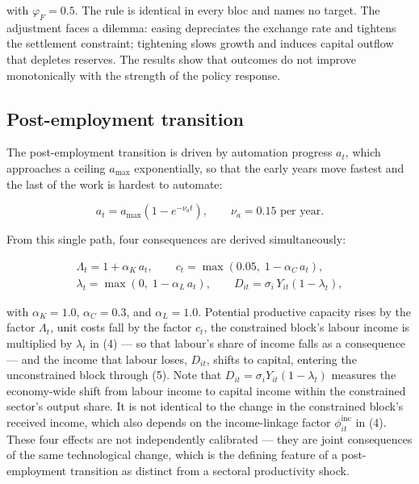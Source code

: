 \documentclass[preprint,review,12pt]{elsarticle}
\begin{document}
with \(\varphi_F = 0.5\). The rule is identical in every bloc and names
no target. The adjustment faces a dilemma: easing depreciates the
exchange rate and tightens the settlement constraint; tightening slows
growth and induces capital outflow that depletes reserves. The results
show that outcomes do not improve monotonically with the strength of the
policy response.

\subsection{Post-employment transition}

The post-employment transition is driven by automation progress \(a_t\),
which approaches a ceiling \(a_{\max}\) exponentially, so that the early
years move fastest and the last of the work is hardest to automate:

\[a_t = a_{\max} \left( 1 - e^{-\nu_a t} \right), \qquad \nu_a = 0.15 \text{ per year}. \tag{37}\]

From this single path, four consequences are derived simultaneously:

\[\begin{gathered} \Lambda_t = 1 + \alpha_K \, a_t, \qquad c_t = \max\left( 0.05,\; 1 - \alpha_C \, a_t \right), \\ \lambda_t = \max\left( 0,\; 1 - \alpha_L \, a_t \right), \qquad D_{it} = \sigma_i \, Y_{it} \left( 1 - \lambda_t \right), \end{gathered} \tag{38}\]

with \(\alpha_K = 1.0\), \(\alpha_C = 0.3\), and \(\alpha_L = 1.0\).
Potential productive capacity rises by the factor \(\Lambda_t\), unit
costs fall by the factor \(c_t\), the constrained block's labour income
is multiplied by \(\lambda_t\) in (4) --- so that labour's share of
income falls as a consequence --- and the income that labour loses,
\(D_{it}\), shifts to capital, entering the unconstrained block through
(5). Note that \(D_{it} = \sigma_i Y_{it}(1 - \lambda_t)\) measures
the economy-wide shift from labour income to capital income within the
constrained sector's output share. It is not identical to the change
in the constrained block's received income, which also depends on the
income-linkage factor \(\phi^{\mathrm{inc}}_{it}\) in (4). These four effects are not independently calibrated --- they are
joint consequences of the same technological change, which is the
defining feature of a post-employment transition as distinct from a
sectoral productivity shock.
\end{document}
